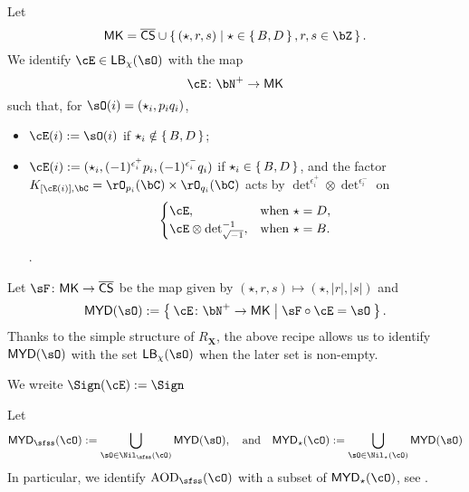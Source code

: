 \documentclass[12pt,a4paper]{amsart}
\def\MYD{{\mathsf{MYD}}}
\def\abs#1{\left|{#1}\right|}
\newcommand{\X}{\mathbf{X}}
\numberwithin{equation}{section}
\theoremstyle{remark}
\begin{document}
Let
\[
  \MK = \CCSS \cup \set{(\star,r,s)|\star\in \set{B,D}, r,s\in \bZ}.
\]
We identify $\cE \in \DCO{\chi}$ with the map
\[
  \cE\colon \bN^{+}\rightarrow  \MK
\]
such that,
for $\sO(i)=(\star_{i},p_{i} q_{i})$,
\begin{itemize}
  \item $\cE(i) := \sO(i)$ if $\star_{i} \notin \set{B,D}$;
  \item $\cE(i) := (\star_{i},(-1)^{\epsilon^{+}_{i}}p_{i},(-1)^{\epsilon^{-}_{i}}q_{i})$
        if $\star_{i}\in \set{B,D}$, and  the factor
        $\KC[[\cE(i)]] =\rO_{p_{i}}(\bC)\times \rO_{q_{i}}(\bC)$ acts by
        ${\det}^{\epsilon^{+}_{i}}\otimes {\det}^{\epsilon^{-}_{i}}$
        on
        \[
        \begin{cases}
          \cE, & \text{when } \star = D,\\
          \cE\otimes \deti^{-1} , & \text{when } \star = B.
        \end{cases}
        \].
\end{itemize}

Let
 $\sF\colon \MK\rightarrow \CCSS$ be the map given by
$(\star,r,s)\mapsto (\star,\abs{r},\abs{s})$ and
\[
  \MYD(\sO) := \Set{\cE\colon \bN^{+}\rightarrow \MK|\sF\circ \cE=\sO }.
\]
Thanks to the simple structure of $R_{\X}$, the above recipe allows us to
identify $\MYD(\sO)$ with the set $\DCO{\chi}$ when the later set is non-empty.

We wreite $\Sign(\cE):= \Sign$

Let
\[
  \MYD_{\sfss}(\cO) := \bigcup_{\sO\in \Nil_{\sfss}(\cO)}\MYD(\sO),%
  \AND
  \MYD_{\star}(\cO) := \bigcup_{\sO\in \Nil_{\star}(\cO)}\MYD(\sO)
\]
 In particular, we identify $\AOD_{\sfss}(\cO)$ with a subset of
 $\MYD_{\star}(\cO)$, see .
\end{document}
